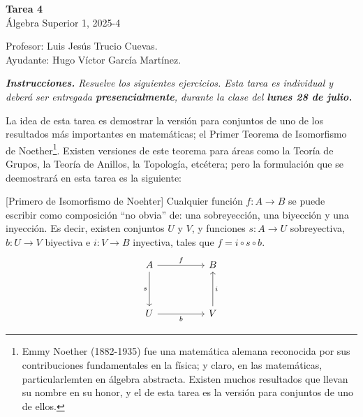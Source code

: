 \documentclass[letterpaper,DIV=14,headsepline,12pt]{scrartcl}
\begin{document}
    \begin{center}
        {\fontsize{30}{60}\rmfamily \textbf{Tarea 4}} \\ \vspace{.2cm} Álgebra
        Superior 1, 2025-4
    \end{center}
    \begin{flushright}
        \footnotesize \hfill Profesor: Luis Jesús Trucio Cuevas.\\
        \hfill Ayudante: Hugo Víctor García Martínez.
    \end{flushright}

    \noindent\textit{\textbf{Instrucciones.} Resuelve los siguientes ejercicios.
    Esta tarea es individual y deberá ser entregada \textbf{presencialmente},
    durante la clase del \textbf{lunes 28 de julio.} \vspace{.4cm}}

    La idea de esta tarea es demostrar la versión para conjuntos de uno de los
    resultados más importantes en matemáticas; el Primer Teorema de Isomorfismo
    de Noether\footnote{Emmy Noether (1882-1935) fue una matemática alemana
    reconocida por sus contribuciones fundamentales en la física; y claro, en
    las matemáticas, particularlemten en álgebra abstracta. Existen muchos
    resultados que llevan su nombre en su honor, y el de esta tarea es la
    versión para conjuntos de uno de ellos.}. Existen versiones de este teorema
    para áreas como la Teoría de Grupos, la Teoría de Anillos, la Topología,
    etcétera; pero la formulación que se deemostrará en esta tarea es la
    siguiente:

    \begin{teorema}\label{teo:primero}[Primero de Isomorfismo de Noehter]
        Cualquier función $f\colon A \to B$ se puede escribir como composición ``no obvia''
        de: una sobreyección, una biyección y una inyección. Es decir, existen
        conjuntos $U$ y $V$, y funciones $s\colon A \to U$ sobreyectiva, $b\colon U \to V$
        biyectiva e $i\colon V \to B$ inyectiva, tales que $f = i \circ s \circ b$.
        \begin{equation}\label{eq:obj}
            \begin{tikzcd}
            A && B \\
            \\
            U && V
            \arrow["f", from=1-1, to=1-3]
            \arrow["s"', from=1-1, to=3-1]
            \arrow["b"', from=3-1, to=3-3]
            \arrow["i"', from=3-3, to=1-3]
        \end{tikzcd}
        \end{equation}
    \end{teorema}
\end{document}
